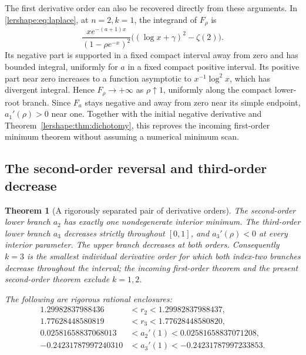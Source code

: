 \documentclass[11pt,a4paper]{article}
\numberwithin{equation}{section}
\newtheorem{theorem}{Theorem}[section]
\theoremstyle{definition}
\theoremstyle{remark}
\begin{document}
The first derivative order can also be recovered directly from these
arguments. In \eqref{lershape:eq:laplace}, at $n=2,k=1$, the integrand
of $F_\rho$ is
\[
 \frac{x e^{-(a+1)x}}{(1-\rho e^{-x})^2}
 \bigl((\log x+\gamma)^2-\zeta(2)\bigr).
\]
Its negative part is supported in a fixed compact interval away from
zero and has bounded integral, uniformly for $a$ in a fixed compact
positive interval. Its positive part near zero increases to a function
asymptotic to $x^{-1}\log^2 x$, which has divergent integral. Hence
$F_\rho\to+\infty$ as $\rho\uparrow1$, uniformly along the compact
lower-root branch. Since $F_a$ stays negative and away from zero near
its simple endpoint, $a_1'(\rho)>0$ near one. Together with the initial
negative derivative and Theorem~\ref{lershape:thm:dichotomy}, this
reproves the incoming first-order minimum theorem without assuming a
numerical minimum scan.

\subsection{The second-order reversal and third-order decrease}

\begin{theorem}[A rigorously separated pair of derivative orders]
\label{lershape:thm:k2k3}
The second-order lower branch $a_2$ has exactly one nondegenerate
interior minimum. The third-order lower branch $a_3$ decreases strictly
throughout $[0,1]$, and $a_3'(\rho)<0$ at every interior parameter.
The upper branch decreases at both orders. Consequently $k=3$ is the
smallest individual derivative order for which both index-two branches
decrease throughout the interval; the incoming first-order theorem and
the present second-order theorem exclude $k=1,2$.

The following are rigorous rational enclosures:
\begin{align*}
 1.29982837988436&<r_2<1.29982837988437,\\
 1.77628448580819&<r_3<1.77628448580820,\\
 0.02581658837068013&<a_2'(1)<0.02581658837071208,\\
 -0.24231787997240310&<a_3'(1)<-0.24231787997233853.
\end{align*}
\end{theorem}
\end{document}
